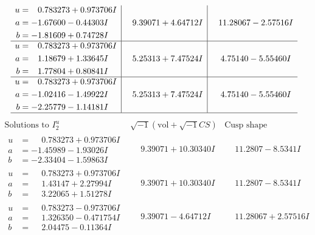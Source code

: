 \documentclass[1p]{elsarticle_modified}
\theoremstyle{definition}
\newcommand{\I}{\sqrt{-1}}
\begin{document}
$$\begin{array}{c|c|c}
\begin{aligned}
u &= \phantom{-}0.783273 + 0.973706 I \\
a &= -1.67600 - 0.44303 I \\
b &= -1.81609 + 0.74728 I\end{aligned}
 & \phantom{-}9.39071 + 4.64712 I & \phantom{-}11.28067 - 2.57516 I \\ \hline\begin{aligned}
u &= \phantom{-}0.783273 + 0.973706 I \\
a &= \phantom{-}1.18679 + 1.33645 I \\
b &= \phantom{-}1.77804 + 0.80841 I\end{aligned}
 & \phantom{-}5.25313 + 7.47524 I & \phantom{-}4.75140 - 5.55460 I \\ \hline\begin{aligned}
u &= \phantom{-}0.783273 + 0.973706 I \\
a &= -1.02416 - 1.49922 I \\
b &= -2.25779 - 1.14181 I\end{aligned}
 & \phantom{-}5.25313 + 7.47524 I & \phantom{-}4.75140 - 5.55460 I\\
 \hline 
 \end{array}$$\newpage$$\begin{array}{c|c|c}  
\text{Solutions to }I^u_{2}& \I (\text{vol} + \sqrt{-1}CS) & \text{Cusp shape}\\
 \hline 
\begin{aligned}
u &= \phantom{-}0.783273 + 0.973706 I \\
a &= -1.45989 - 1.93026 I \\
b &= -2.33404 - 1.59863 I\end{aligned}
 & \phantom{-}9.39071 + 10.30340 I & \phantom{-}11.2807 - 8.5341 I \\ \hline\begin{aligned}
u &= \phantom{-}0.783273 + 0.973706 I \\
a &= \phantom{-}1.43147 + 2.27994 I \\
b &= \phantom{-}3.22065 + 1.51278 I\end{aligned}
 & \phantom{-}9.39071 + 10.30340 I & \phantom{-}11.2807 - 8.5341 I \\ \hline\begin{aligned}
u &= \phantom{-}0.783273 - 0.973706 I \\
a &= \phantom{-}1.326350 - 0.471754 I \\
b &= \phantom{-}2.04475 - 0.11364 I\end{aligned}
 & \phantom{-}9.39071 - 4.64712 I & \phantom{-}11.28067 + 2.57516 I \\ \hline\begin{aligned}

\end{aligned}
\end{array}$$
\end{document}
